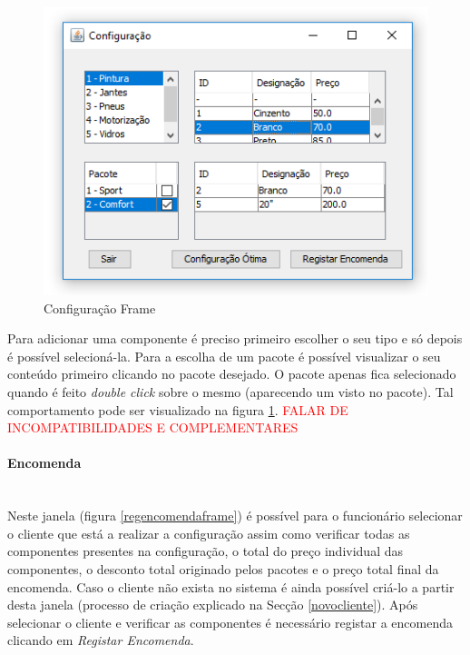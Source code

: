 \documentclass[11pt]{article} %
\newcommand{\myparagraph}[1]{\paragraph{#1}\mbox{}\\}
\begin{document}
\begin{figure}[H]
	\centering
	\includegraphics[]{configframe.png}
	\caption{Configuração Frame}
	\label{configframe}
\end{figure}

Para adicionar uma componente é preciso primeiro escolher o seu tipo e só depois é possível selecioná-la. Para a escolha de um pacote é possível visualizar o seu conteúdo primeiro clicando no pacote desejado. O pacote apenas fica selecionado quando é feito \textit{double click} sobre o mesmo (aparecendo um visto no pacote). Tal comportamento pode ser visualizado na figura \ref{configframe}.
\textcolor{red}{FALAR DE INCOMPATIBILIDADES E COMPLEMENTARES}



\myparagraph{Encomenda}

Neste janela (figura \ref{regencomendaframe}) é possível para o funcionário selecionar o cliente que está a realizar a configuração assim como verificar todas as componentes presentes na configuração, o total do preço individual das componentes, o desconto total originado pelos pacotes e o preço total final da encomenda. Caso o cliente não exista no sistema é ainda possível criá-lo a partir desta janela (processo de criação explicado na Secção \ref{novocliente}). Após selecionar o cliente e verificar as componentes é necessário registar a encomenda clicando em \textit{Registar Encomenda}.
\end{document}
